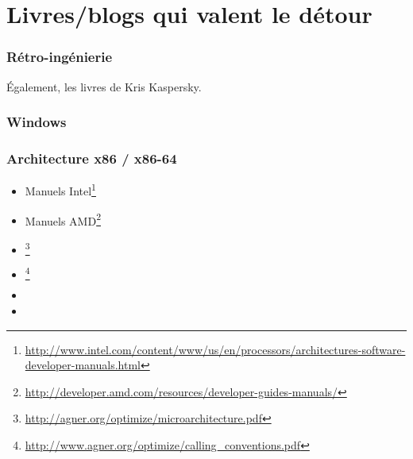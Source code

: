 \chapter{Livres/blogs qui valent le détour}


\subsection{Rétro-ingénierie}



Également, les livres de Kris Kaspersky.

\subsection{Windows}



\subsection{\CCpp}



\subsection{Architecture x86 / x86-64}

\label{x86_manuals}
\begin{itemize}
\item Manuels Intel\footnote{\AlsoAvailableAs \url{http://www.intel.com/content/www/us/en/processors/architectures-software-developer-manuals.html}}

\item Manuels AMD\footnote{\AlsoAvailableAs \url{http://developer.amd.com/resources/developer-guides-manuals/}}

\item \AgnerFog{}\footnote{\AlsoAvailableAs \url{http://agner.org/optimize/microarchitecture.pdf}}

\item \AgnerFogCC{}\footnote{\AlsoAvailableAs \url{http://www.agner.org/optimize/calling_conventions.pdf}}

\item \IntelOptimization

\item \AMDOptimization
\end{itemize}

